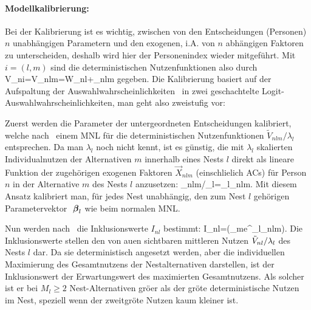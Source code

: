 \paragraph{Modellkalibrierung:}
Bei der Kalibrierung ist es wichtig, zwischen von den
Entscheidungen (Personen) $n$ unabh\"angigen Parametern und den
exogenen, i.A. von $n$ abh\"angigen Faktoren zu unterscheiden, deshalb
wird hier der Personenindex wieder mitgef\"uhrt. Mit $i=(l,m)$ sind
die deterministischen 
Nutzenfunktionen also durch
\bdm
V_{ni}=V_{nlm}=W_{nl}+\tilV_{nlm}
\edm
gegeben.
Die Kalibrierung basiert auf der Aufspaltung der
Auswahlwahrscheinlichkeiten~ in zwei geschachtelte
Logit-Auswahlwahrscheinlichkeiten, man geht also zweistufig vor:

\bi
\item Zuerst werden die Parameter der
untergeordneten Entscheidungen kalibriert, welche nach~
einem MNL f\"ur die deterministischen Nutzenfunktionen
$\tilde{V}_{nlm}/\lambda_l$ entsprechen. Da man
  $\lambda_l$ noch nicht kennt, ist es g\"unstig, die mit
  $\lambda_l$ skalierten Individualnutzen der Alternativen $m$ innerhalb
eines Nests $l$ direkt als lineare Funktion der
  zugeh\"origen exogenen Faktoren $\vec{X}_{nlm}$ (einschlie\3lich
  ACs) f\"ur Person $n$ in
  der Alternative $m$ des Nests $l$ anzusetzen:
\be
\label{Vdurchlambda}
\tilV_{nlm}/\lambda_l=\vecbeta_{l}\tr {}_{nlm}.
\ee
Mit diesem Ansatz kalibriert man, f\"ur jedes Nest unabh\"angig, den zum Nest $l$
geh\"origen Parametervektor ${\mbox{ \boldmath{$\beta$}}}_{l}$  wie beim normalen
MNL.

\item 
Nun werden nach~ die Inklusionswerte $I_{nl}$ bestimmt:
\be
\label{Inl}
I_{nl}=\ln\left(\sum_{m}e^{\hatvecbeta_{l}\tr {}_{nlm}}\right).
\ee
Die Inklusionswerte stellen den von au\3en sichtbaren mittleren Nutzen 
$\tilde{V}_{nl}/\lambda_l$ des
Nests $l$ dar. Da sie deterministisch angesetzt werden, aber die
individuellen Maximierung des Gesamtnutzens der Nestalternativen
darstellen, ist der Inklusionswert der Erwartungswert des maximierten
Gesamtnutzens. Als solcher ist er bei $M_l\ge 2$ Nest-Alternativen
gr\"o\3er als der gr\"o\3te deterministische Nutzen im Nest, speziell
wenn der zweitgr\"o\3te Nutzen kaum kleiner ist. 

